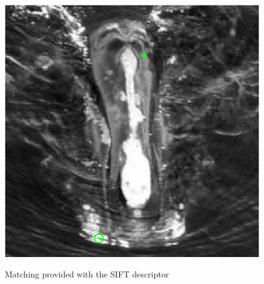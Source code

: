 \documentclass[twoside]{article}
\begin{document}
\begin{multicols}{2}
\begin{figure}[H]
{\includegraphics[scale=0.13]{img/corr_bad.png}
}
\quad
{}
\caption{Matching provided with the SIFT descriptor}
\label{fig:fig_sift}
\end{figure}




\end{multicols}
\end{document}

